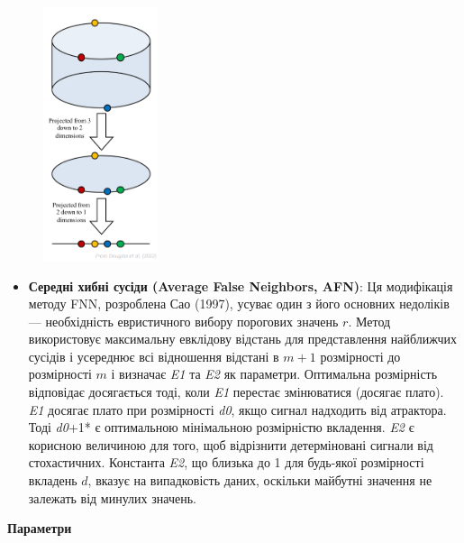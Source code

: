 \documentclass[
  letterpaper,
]{report}
\providecommand{\tightlist}{%
  \setlength{\itemsep}{0pt}\setlength{\parskip}{0pt}}\usepackage{longtable,booktabs,array}
\begin{document}
\begin{figure}

{\centering \includegraphics[width=0.3\textwidth,height=\textheight]{Images/lab_2/douglas2022b.png}

}

\end{figure}

\begin{itemize}
\tightlist
\item
  \textbf{Середні хибні сусіди (Average False Neighbors, AFN)}: Ця
  модифікація методу FNN, розроблена Сао (1997), усуває один з його
  основних недоліків --- необхідність евристичного вибору порогових
  значень \(r\). Метод використовує максимальну евклідову відстань для
  представлення найближчих сусідів і усереднює всі відношення відстані в
  \(m+1\) розмірності до розмірності \(m\) і визначає \emph{E1} та
  \emph{E2} як параметри. Оптимальна розмірність відповідає досягається
  тоді, коли \emph{E1} перестає змінюватися (досягає плато). \emph{E1}
  досягає плато при розмірності \emph{d0}, якщо сигнал надходить від
  атрактора. Тоді \emph{d0}+1* є оптимальною мінімальною розмірністю
  вкладення. \emph{E2} є корисною величиною для того, щоб відрізнити
  детерміновані сигнали від стохастичних. Константа \emph{E2}, що
  близька до 1 для будь-якої розмірності вкладень \(d\), вказує на
  випадковість даних, оскільки майбутні значення не залежать від минулих
  значень.
\end{itemize}

\textbf{Параметри}
\end{document}
